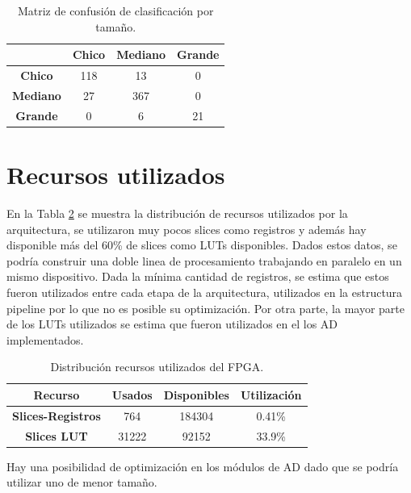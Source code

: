 \documentclass[twoside,spanish,ESP,MSc]{plantillaLabUPV}
\theoremstyle{definition}
\begin{document}
\begin{table}[!tbh]
	\caption{Matriz de confusión de clasificación por tamaño.}
	\label{mdctam}
	\centering
	\begin{tabular}{c|c|c|c|}
		\cline{2-4}
		& \textbf{Chico} & \textbf{Mediano} & \textbf{Grande} \\ \hline
		\multicolumn{1}{|c|}{\textbf{Chico}}   & 118            & 13               & 0               \\ \hline
		\multicolumn{1}{|c|}{\textbf{Mediano}} & 27             & 367              & 0               \\ \hline
		\multicolumn{1}{|c|}{\textbf{Grande}}  & 0              & 6                & 21              \\ \hline
	\end{tabular}
\end{table}


\newpage
\section{Recursos utilizados}
En la Tabla \ref{resources} se muestra la distribución de recursos utilizados por la arquitectura, se utilizaron muy pocos slices como registros y además hay disponible más del 60\% de slices como LUTs disponibles. Dados estos datos, se podría construir una doble linea de procesamiento trabajando en paralelo en un mismo dispositivo. Dada la mínima cantidad de registros, se estima que estos fueron utilizados entre cada etapa de la arquitectura, utilizados en la estructura pipeline por lo que no es posible su optimización. Por otra parte, la mayor parte de los LUTs utilizados se estima que fueron utilizados en el los AD implementados.

\begin{table}[!tbh]
	\caption{Distribución recursos utilizados del FPGA.}
	\label{resources}
	\centering
	\begin{tabular}{|c|c|c|c|}
		\hline
		\textbf{Recurso}          & \textbf{Usados} & \textbf{Disponibles} & \textbf{Utilización} \\ \hline
		\textbf{Slices-Registros} & 764             & 184304               & 0.41\%               \\ \hline
		\textbf{Slices LUT}       & 31222           & 92152                & 33.9\%               \\ \hline
	\end{tabular}
\end{table}

Hay una posibilidad de optimización en los módulos de AD dado que se podría utilizar uno de menor tamaño. 
\end{document}
